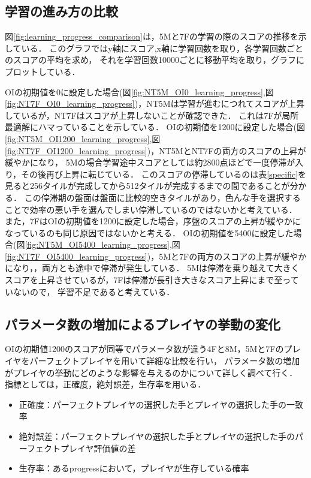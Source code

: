 \subsection{学習の進み方の比較}
図\ref{fig:learning_progress_comparison}は，5Mと7Fの学習の際のスコアの推移を示している．
このグラフではy軸にスコア,x軸に学習回数を取り，各学習回数ごとのスコアの平均を求め，
それを学習回数10000ごとに移動平均を取り，グラフにプロットしている．

OIの初期値を0に設定した場合(図\ref{fig:NT5M_OI0_learning_progress},図\ref{fig:NT7F_OI0_learning_progress})，NT5Mは学習が進むにつれてスコアが上昇しているが，NT7Fはスコアが上昇しないことが確認できた．
これは7Fが局所最適解にハマっていることを示している．
OIの初期値を1200に設定した場合(図\ref{fig:NT5M_OI1200_learning_progress},図\ref{fig:NT7F_OI1200_learning_progress})，NT5MとNT7Fの両方のスコアの上昇が緩やかになり，
5Mの場合学習途中スコアとしては約2800点ほどで一度停滞が入り，その後再び上昇に転じている．
このスコアの停滞しているのは表\ref{specific}を見ると256タイルが完成してから512タイルが完成するまでの間であることが分かる．
この停滞期の盤面は盤面に比較的空きタイルがあり，色んな手を選択することで効率の悪い手を選んでしまい停滞しているのではないかと考えている．
また，7FはOIの初期値を1200に設定した場合，序盤のスコアの上昇が緩やかになっているのも同じ原因ではないかと考える．
OIの初期値を5400に設定した場合(図\ref{fig:NT5M_OI5400_learning_progress},図\ref{fig:NT7F_OI5400_learning_progress})，5Mと7Fの両方のスコアの上昇が緩やかになり，，両方とも途中で停滞が発生している．
5Mは停滞を乗り越えて大きくスコアを上昇させているが，7Fは停滞が長引き大きなスコア上昇にまで至っていないので，
学習不足であると考えている．

\subsection{パラメータ数の増加によるプレイヤの挙動の変化}
OIの初期値1200のスコアが同等でパラメータ数が違う4Fと8M，5Mと7Fのプレイヤをパーフェクトプレイヤを用いて詳細な比較を行い，
パラメータ数の増加がプレイヤの挙動にどのような影響を与えるのかについて詳しく調べて行く．
指標としては，正確度，絶対誤差，生存率を用いる．
\begin{itemize}
    \item 正確度：パーフェクトプレイヤの選択した手とプレイヤの選択した手の一致率
    \item 絶対誤差：パーフェクトプレイヤの選択した手とプレイヤの選択した手のパーフェクトプレイヤ評価値の差
    \item 生存率：あるprogressにおいて，プレイヤが生存している確率
\end{itemize}

